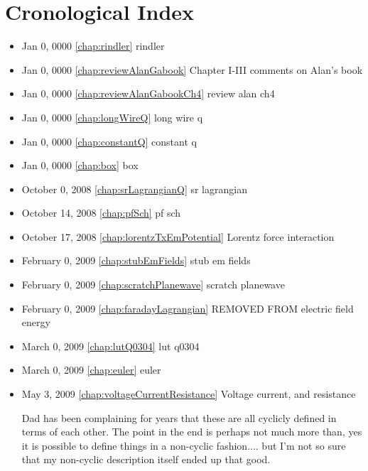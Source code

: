\chapter{Cronological Index}
\label{chap:Cronology}

\begin{itemize}

\item Jan 0, 0000 \ref{chap:rindler} rindler

\item Jan 0, 0000 \ref{chap:reviewAlanGabook} Chapter I-III comments on Alan's book

\item Jan 0, 0000 \ref{chap:reviewAlanGabookCh4} review alan ch4

\item Jan 0, 0000 \ref{chap:longWireQ} long wire q

\item Jan 0, 0000 \ref{chap:constantQ} constant q

\item Jan 0, 0000 \ref{chap:box} box

\item October 0, 2008 \ref{chap:srLagrangianQ} sr lagrangian

\item October 14, 2008 \ref{chap:pfSch} pf sch

\item October 17, 2008 \ref{chap:lorentzTxEmPotential} Lorentz force interaction

\item February 0, 2009 \ref{chap:stubEmFields} stub em fields

\item February 0, 2009 \ref{chap:scratchPlanewave} scratch planewave

\item February 0, 2009 \ref{chap:faradayLagrangian} REMOVED FROM electric field energy

\item March 0, 2009 \ref{chap:lutQ0304} lut q0304

\item March 0, 2009 \ref{chap:euler} euler

\item May 3, 2009 \ref{chap:voltageCurrentResistance} Voltage current, and resistance

Dad has been complaining for years that these are all cyclicly defined in terms of each other.  The point in the end is perhaps not much more than, yes it is possible to define things in a non-cyclic fashion.... but I'm not so sure that my non-cyclic description itself ended up that good. \end{itemize}

